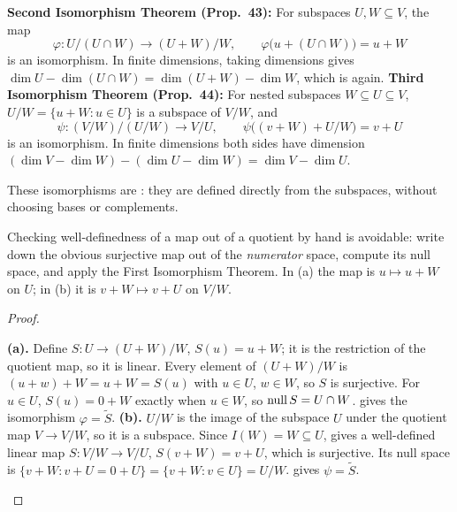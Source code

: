 \documentclass[10pt]{scrartcl}
\begin{document}
\begin{theorem*}
  \begin{enumerate}[(a)]
    \ii \textbf{Second Isomorphism Theorem (Prop.~43):} For subspaces $U,W\subseteq V$, the map
    \[
      \varphi\colon U/(U\cap W) \to (U+W)/W, \qquad \varphi\big(u + (U\cap W)\big) = u + W
    \]
    is an isomorphism. In finite dimensions, taking dimensions gives $\dim U-\dim(U\cap W)=\dim(U+W)-\dim W$, which is  again.
    \ii \textbf{Third Isomorphism Theorem (Prop.~44):} For nested subspaces $W\subseteq U\subseteq V$, $U/W=\{u+W:u\in U\}$ is a subspace of $V/W$, and
    \[
      \psi\colon (V/W)\big/(U/W) \to V/U, \qquad \psi\big((v+W) + U/W\big) = v + U
    \]
    is an isomorphism. In finite dimensions both sides have dimension $(\dim V-\dim W)-(\dim U-\dim W)=\dim V-\dim U$.
  \end{enumerate}
  These isomorphisms are : they are defined directly from the subspaces, without choosing bases or complements.
\end{theorem*}
\begin{ideabox}
  Checking well-definedness of a map out of a quotient by hand is avoidable: write down the obvious surjective map out of the \emph{numerator} space, compute its null space, and apply the First Isomorphism Theorem. In (a) the map is $u\mapsto u+W$ on $U$; in (b) it is $v+W\mapsto v+U$ on $V/W$.
\end{ideabox}
\begin{proof}
  \begin{steps}
    \ii \textbf{(a).} Define $S\colon U\to(U+W)/W$, $S(u)=u+W$; it is the restriction of the quotient map, so it is linear. Every element of $(U+W)/W$ is $(u+w)+W=u+W=S(u)$ with $u\in U$, $w\in W$, so $S$ is surjective. For $u\in U$, $S(u)=0+W$ exactly when $u\in W$, so $\operatorname{null} S=U\cap W$.  gives the isomorphism $\varphi=\widetilde S$.
    \ii \textbf{(b).} $U/W$ is the image of the subspace $U$ under the quotient map $V\to V/W$, so it is a subspace. Since $I(W)=W\subseteq U$,  gives a well-defined linear map $S\colon V/W\to V/U$, $S(v+W)=v+U$, which is surjective. Its null space is $\{v+W:v+U=0+U\}=\{v+W:v\in U\}=U/W$.  gives $\psi=\widetilde S$.
  \end{steps}
\end{proof}
\end{document}
